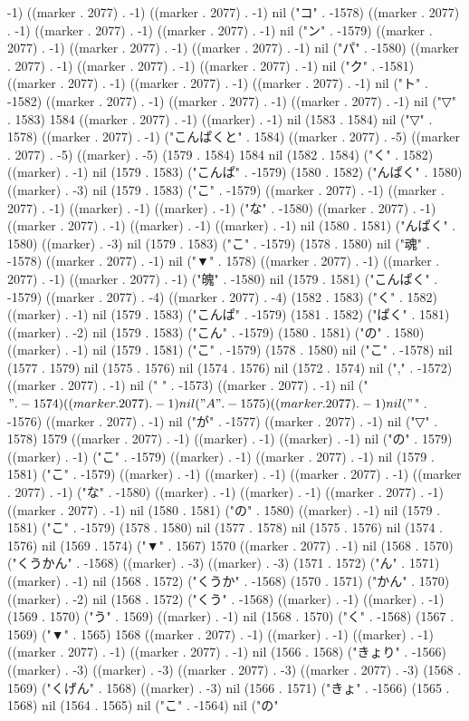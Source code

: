 -1) ((marker . 2077) . -1) ((marker . 2077) . -1) nil ("コ" . -1578) ((marker . 2077) . -1) ((marker . 2077) . -1) ((marker . 2077) . -1) nil ("ン" . -1579) ((marker . 2077) . -1) ((marker . 2077) . -1) ((marker . 2077) . -1) nil ("パ" . -1580) ((marker . 2077) . -1) ((marker . 2077) . -1) ((marker . 2077) . -1) nil ("ク" . -1581) ((marker . 2077) . -1) ((marker . 2077) . -1) ((marker . 2077) . -1) nil ("ト" . -1582) ((marker . 2077) . -1) ((marker . 2077) . -1) ((marker . 2077) . -1) nil ("▽" . 1583) 1584 ((marker . 2077) . -1) ((marker) . -1) nil (1583 . 1584) nil ("▽" . 1578) ((marker . 2077) . -1) ("こんぱくと" . 1584) ((marker . 2077) . -5) ((marker . 2077) . -5) ((marker) . -5) (1579 . 1584) 1584 nil (1582 . 1584) ("く" . 1582) ((marker) . -1) nil (1579 . 1583) ("こんぱ" . -1579) (1580 . 1582) ("んぱく" . 1580) ((marker) . -3) nil (1579 . 1583) ("こ" . -1579) ((marker . 2077) . -1) ((marker . 2077) . -1) ((marker) . -1) ((marker) . -1) ("な" . -1580) ((marker . 2077) . -1) ((marker . 2077) . -1) ((marker) . -1) ((marker) . -1) nil (1580 . 1581) ("んぱく" . 1580) ((marker) . -3) nil (1579 . 1583) ("こ" . -1579) (1578 . 1580) nil ("魂" . -1578) ((marker . 2077) . -1) nil ("▼" . 1578) ((marker . 2077) . -1) ((marker . 2077) . -1) ((marker . 2077) . -1) ("魄" . -1580) nil (1579 . 1581) ("こんぱく" . -1579) ((marker . 2077) . -4) ((marker . 2077) . -4) (1582 . 1583) ("く" . 1582) ((marker) . -1) nil (1579 . 1583) ("こんぱ" . -1579) (1581 . 1582) ("ぱく" . 1581) ((marker) . -2) nil (1579 . 1583) ("こん" . -1579) (1580 . 1581) ("の" . 1580) ((marker) . -1) nil (1579 . 1581) ("こ" . -1579) (1578 . 1580) nil ("こ" . -1578) nil (1577 . 1579) nil (1575 . 1576) nil (1574 . 1576) nil (1572 . 1574) nil ("," . -1572) ((marker . 2077) . -1) nil (" " . -1573) ((marker . 2077) . -1) nil ("$" . -1574) ((marker . 2077) . -1) nil ("A" . -1575) ((marker . 2077) . -1) nil ("$" . -1576) ((marker . 2077) . -1) nil ("が" . -1577) ((marker . 2077) . -1) nil ("▽" . 1578) 1579 ((marker . 2077) . -1) ((marker) . -1) ((marker) . -1) nil ("の" . 1579) ((marker) . -1) ("こ" . -1579) ((marker) . -1) ((marker . 2077) . -1) nil (1579 . 1581) ("こ" . -1579) ((marker) . -1) ((marker) . -1) ((marker . 2077) . -1) ((marker . 2077) . -1) ("な" . -1580) ((marker) . -1) ((marker) . -1) ((marker . 2077) . -1) ((marker . 2077) . -1) nil (1580 . 1581) ("の" . 1580) ((marker) . -1) nil (1579 . 1581) ("こ" . -1579) (1578 . 1580) nil (1577 . 1578) nil (1575 . 1576) nil (1574 . 1576) nil (1569 . 1574) ("▼" . 1567) 1570 ((marker . 2077) . -1) nil (1568 . 1570) ("くうかん" . -1568) ((marker) . -3) ((marker) . -3) (1571 . 1572) ("ん" . 1571) ((marker) . -1) nil (1568 . 1572) ("くうか" . -1568) (1570 . 1571) ("かん" . 1570) ((marker) . -2) nil (1568 . 1572) ("くう" . -1568) ((marker) . -1) ((marker) . -1) (1569 . 1570) ("う" . 1569) ((marker) . -1) nil (1568 . 1570) ("く" . -1568) (1567 . 1569) ("▼" . 1565) 1568 ((marker . 2077) . -1) ((marker) . -1) ((marker) . -1) ((marker . 2077) . -1) ((marker . 2077) . -1) nil (1566 . 1568) ("きょり" . -1566) ((marker) . -3) ((marker) . -3) ((marker . 2077) . -3) ((marker . 2077) . -3) (1568 . 1569) ("くげん" . 1568) ((marker) . -3) nil (1566 . 1571) ("きょ" . -1566) (1565 . 1568) nil (1564 . 1565) nil ("こ" . -1564) nil ("の" 